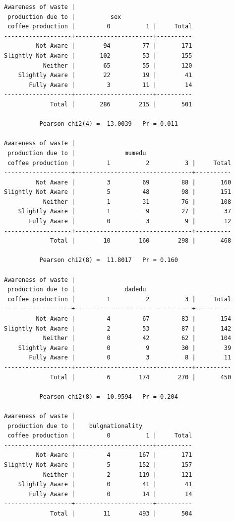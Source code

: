 \documentclass[
]{book}
\begin{document}
\begin{verbatim}
Awareness of waste |
 production due to |          sex
 coffee production |         0          1 |     Total
-------------------+----------------------+----------
         Not Aware |        94         77 |       171 
Slightly Not Aware |       102         53 |       155 
           Neither |        65         55 |       120 
    Slightly Aware |        22         19 |        41 
       Fully Aware |         3         11 |        14 
-------------------+----------------------+----------
             Total |       286        215 |       501 

          Pearson chi2(4) =  13.0039   Pr = 0.011

Awareness of waste |
 production due to |              mumedu
 coffee production |         1          2          3 |     Total
-------------------+---------------------------------+----------
         Not Aware |         3         69         88 |       160 
Slightly Not Aware |         5         48         98 |       151 
           Neither |         1         31         76 |       108 
    Slightly Aware |         1          9         27 |        37 
       Fully Aware |         0          3          9 |        12 
-------------------+---------------------------------+----------
             Total |        10        160        298 |       468 

          Pearson chi2(8) =  11.8017   Pr = 0.160

Awareness of waste |
 production due to |              dadedu
 coffee production |         1          2          3 |     Total
-------------------+---------------------------------+----------
         Not Aware |         4         67         83 |       154 
Slightly Not Aware |         2         53         87 |       142 
           Neither |         0         42         62 |       104 
    Slightly Aware |         0          9         30 |        39 
       Fully Aware |         0          3          8 |        11 
-------------------+---------------------------------+----------
             Total |         6        174        270 |       450 

          Pearson chi2(8) =  10.9594   Pr = 0.204

Awareness of waste |
 production due to |    bulgnationality
 coffee production |         0          1 |     Total
-------------------+----------------------+----------
         Not Aware |         4        167 |       171 
Slightly Not Aware |         5        152 |       157 
           Neither |         2        119 |       121 
    Slightly Aware |         0         41 |        41 
       Fully Aware |         0         14 |        14 
-------------------+----------------------+----------
             Total |        11        493 |       504 


\end{verbatim}
\end{document}
